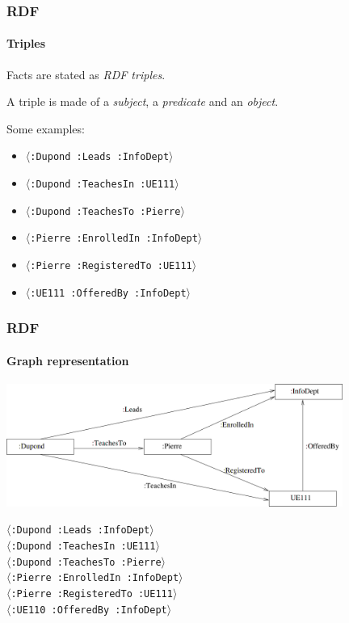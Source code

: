 \documentclass{beamer}
\newcommand{\triple}[1]{$\langle$\texttt{#1}$\rangle$}
\begin{document}
\begin{frame}
  \frametitle{RDF}
  \framesubtitle{Triples}

  Facts are stated as \textit{RDF triples}.

  \pause

  \medskip

  A triple is made of a \textit{subject}, a \textit{predicate} and an
  \textit{object}.

  \pause

  \medskip

  Some examples:

  \pause

  \begin{itemize}
    \item \triple{:Dupond :Leads :InfoDept}

    \pause

    \item \triple{:Dupond :TeachesIn :UE111}

    \pause

    \item \triple{:Dupond :TeachesTo :Pierre}

    \pause

    \item \triple{:Pierre :EnrolledIn :InfoDept}

    \pause

    \item \triple{:Pierre :RegisteredTo :UE111}

    \pause

    \item \triple{:UE111 :OfferedBy :InfoDept}
  \end{itemize}
\end{frame}

\begin{frame}
  \frametitle{RDF}
  \framesubtitle{Graph representation}

  \begin{center}
    \includegraphics[width=11cm]{graph.png}
  \end{center}

  \triple{:Dupond :Leads :InfoDept} \\
  \triple{:Dupond :TeachesIn :UE111} \\
  \triple{:Dupond :TeachesTo :Pierre} \\
  \triple{:Pierre :EnrolledIn :InfoDept} \\
  \triple{:Pierre :RegisteredTo :UE111} \\
  \triple{:UE110 :OfferedBy :InfoDept}
\end{frame}
\end{document}
